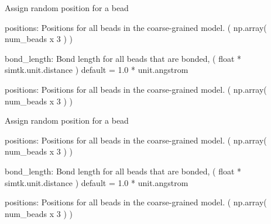 \documentclass[letterpaper,12pt,english,openany,oneside]{sphinxmanual}
\begin{document}
\begin{fulllineitems}
\label{\detokenize{utilities:utilities.util.assign_position}}
Assign random position for a bead

positions: Positions for all beads in the coarse-grained model.
( np.array( num\_beads x 3 ) )

bond\_length: Bond length for all beads that are bonded,
( float * simtk.unit.distance )
default = 1.0 * unit.angstrom

positions: Positions for all beads in the coarse-grained model.
( np.array( num\_beads x 3 ) )

\end{fulllineitems}


\begin{fulllineitems}
\label{\detokenize{utilities:utilities.util.assign_position_lattice_style}}
Assign random position for a bead

positions: Positions for all beads in the coarse-grained model.
( np.array( num\_beads x 3 ) )

bond\_length: Bond length for all beads that are bonded,
( float * simtk.unit.distance )
default = 1.0 * unit.angstrom

positions: Positions for all beads in the coarse-grained model.
( np.array( num\_beads x 3 ) )

\end{fulllineitems}

\end{document}
